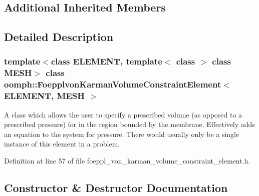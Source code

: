 \subsection*{Additional Inherited Members}


\subsection{Detailed Description}
\subsubsection*{template$<$class E\+L\+E\+M\+E\+NT, template$<$ class $>$ class M\+E\+SH$>$\newline
class oomph\+::\+Foepplvon\+Karman\+Volume\+Constraint\+Element$<$ E\+L\+E\+M\+E\+N\+T, M\+E\+S\+H $>$}

A class which allows the user to specify a prescribed volume (as opposed to a prescribed pressure) for in the region bounded by the membrane. Effectively adds an equation to the system for pressure. There would usually only be a single instance of this element in a problem. 

Definition at line 57 of file foeppl\+\_\+von\+\_\+karman\+\_\+volume\+\_\+constraint\+\_\+element.\+h.



\subsection{Constructor \& Destructor Documentation}
\mbox{\label{classoomph_1_1FoepplvonKarmanVolumeConstraintElement_af470df251a724f84a330e506bf9e14c3}} 
